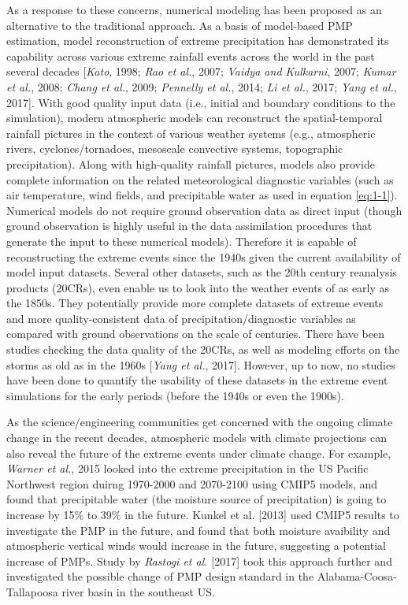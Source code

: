 As a response to these concerns, numerical modeling has been proposed as an alternative to the traditional approach. As a basis of model-based PMP estimation, model reconstruction of extreme precipitation has demonstrated its capability across various extreme rainfall events across the world in the past several decades [\textit{Kato}, 1998; \textit{Rao et al.}, 2007; \textit{Vaidya and Kulkarni}, 2007; \textit{Kumar et al.}, 2008; \textit{Chang et al.}, 2009; \textit{Pennelly et al.}, 2014; \textit{Li et al.}, 2017; \textit{Yang et al.}, 2017]. With good quality input data (i.e., initial and boundary conditions to the simulation), modern atmospheric models can reconstruct the spatial-temporal rainfall pictures in the context of various weather systems (e.g., atmospheric rivers, cyclones/tornadoes, mesoscale convective systems, topographic precipitation). Along with high-quality rainfall pictures, models also provide complete information on the related meteorological diagnostic variables (such as air temperature, wind fields, and precipitable water as used in equation \ref{eq:1-1}). Numerical models do not require ground observation data as direct input (though ground observation is highly useful in the data assimilation procedures that generate the input to these numerical models). Therefore it is capable of reconstructing the extreme events since the 1940s given the current availability of model input datasets. Several other datasets, such as the 20th century reanalysis products (20CRs), even enable us to look into the weather events of as early as the 1850s. They potentially provide more complete datasets of extreme events and more quality-consistent data of precipitation/diagnostic variables as compared with ground observations on the scale of centuries. There have been studies checking the data quality of the 20CRs, as well as modeling efforts on the storms as old as in the 1960s [\textit{Yang et al.}, 2017]. However, up to now, no studies have been done to quantify the usability of these datasets in the extreme event simulations for the early periods (before the 1940s or even the 1900s).

As the science/engineering communities get concerned with the ongoing climate change in the recent decades, atmospheric models with climate projections can also reveal the future of the extreme events under climate change. For example, \textit{Warner et al.}, 2015 looked into the extreme precipitation in the US Pacific Northwest region duirng 1970-2000 and 2070-2100 using CMIP5 models, and found that precipitable water (the moisture source of precipitation) is going to increase by 15\% to 39\% in the future. Kunkel et al. [2013] used CMIP5 results to investigate the PMP in the future, and found that both moisture avaibility and atmospheric vertical winds would increase in the future, suggesting a potential increase of PMPs. Study by \textit{Rastogi et al.} [2017] took this approach further and investigated the possible change of PMP design standard in the Alabama-Coosa-Tallapoosa river basin in the southeast US.

